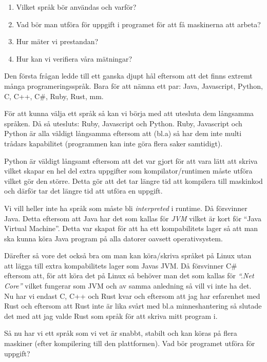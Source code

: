 \documentclass[12pt, a4paper]{report}
\begin{document}
\begin{enumerate}
   \item Vilket språk bör användas och varför?
   \item Vad bör man utföra för uppgift i programet för att få maskinerna att arbeta?
   \item Hur mäter vi prestandan?
   \item Hur kan vi verifiera våra mätningar?
\end{enumerate}
 
Den första frågan ledde till ett ganska djupt hål eftersom att det finns extremt många programeringsspråk. Bara för att nämna ett par: Java, Javascript, Python, C, C++, C\#, Ruby, Rust, mm. 


För att kunna välja ett språk så kan vi börja med att utesluta dem långsamma språken. Då så utesluts: Ruby, Javascript och Python. Ruby, Javascript och Python är alla väldigt långsamma eftersom att (bl.a) så har dem inte multi trådars kapabilitet (programmen kan inte göra flera saker samtidigt).

 Python är väldigt långsamt eftersom att det var gjort för att vara lätt att skriva vilket skapar en hel del extra uppgifter som kompilator/runtimen måste utföra vilket gör den större. Detta gör att det tar längre tid att kompilera till maskinkod och därför tar det längre tid att utföra en uppgift. 
 
 Vi vill heller inte ha språk som måste bli \textit{interpreted} i runtime. Då försvinner Java. Detta eftersom att Java har det som kallas för \textit{JVM} vilket är kort för ``Java Virtual Machine''. Detta var skapat för att ha ett kompabilitets lager så att man ska kunna köra Java program på alla datorer oavsett operativsystem. 
 
 Därefter så vore det också bra om man kan köra/skriva språket på Linux utan att lägga till extra kompabilitets lager som Javas JVM. Då försvinner C\# eftersom att, för att köra det på Linux så behöver man det som kallas för \textit{``.Net Core''} vilket fungerar som JVM och av samma anledning så vill vi inte ha det. Nu har vi endast C, C++ och Rust kvar och eftersom att jag har erfarenhet med Rust och eftersom att Rust inte är lika svårt med bl.a minneshantering så slutade det med att jag valde Rust som språk för att skriva mitt program i.
 
 
Så nu har vi ett språk som vi vet är snabbt, stabilt och kan köras på flera maskiner (efter kompilering till den plattformen). Vad bör programet utföra för uppgift?
\end{document}
